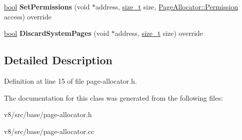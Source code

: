 \begin{DoxyCompactItemize}
\item 
\mbox{\label{classv8_1_1base_1_1PageAllocator_acf603de554e14db00ba33c9b02f36418}} 
\mbox{\hyperlink{classbool}{bool}} {\bfseries Set\+Permissions} (void $\ast$address, \mbox{\hyperlink{classsize__t}{size\+\_\+t}} size, \mbox{\hyperlink{classv8_1_1PageAllocator_a88f74b164fe97e053259f67a95758415}{Page\+Allocator\+::\+Permission}} access) override
\item 
\mbox{\label{classv8_1_1base_1_1PageAllocator_a1b645a1ba34f342365b9ec613134da56}} 
\mbox{\hyperlink{classbool}{bool}} {\bfseries Discard\+System\+Pages} (void $\ast$address, \mbox{\hyperlink{classsize__t}{size\+\_\+t}} size) override
\end{DoxyCompactItemize}


\subsection{Detailed Description}


Definition at line 15 of file page-\/allocator.\+h.



The documentation for this class was generated from the following files\+:\begin{DoxyCompactItemize}
\item 
v8/src/base/page-\/allocator.\+h\item 
v8/src/base/page-\/allocator.\+cc\end{DoxyCompactItemize}
